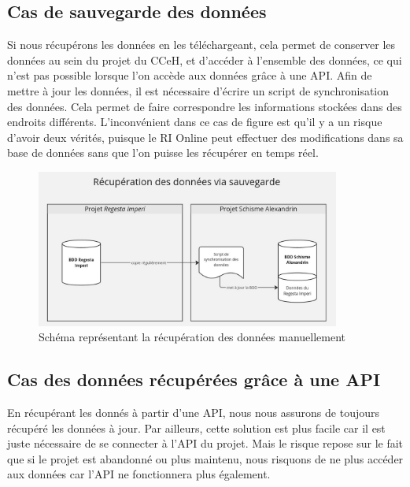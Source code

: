     \subsection{Cas de sauvegarde des données}

Si nous récupérons les données en les téléchargeant, cela permet de conserver les données au sein du projet du CCeH, et d'accéder à l'ensemble des données, ce qui n'est pas possible lorsque l'on accède aux données grâce à une API.
Afin de mettre à jour les données, il est nécessaire d'écrire un script de synchronisation des données. Cela permet de faire correspondre les informations stockées dans des endroits différents. L'inconvénient dans ce cas de figure est qu'il y a un risque d'avoir deux vérités, puisque le RI Online peut effectuer des modifications dans sa base de données sans que l'on puisse les récupérer en temps réel.\\ 

\begin{figure}[H]
    \centering
    \includegraphics[width=10cm]{images/recup-donnees-sauvegarde.jpg}
    \caption{Schéma représentant la récupération des données manuellement}
    \label{fig:schemadonneessauvegarde}
\end{figure}


    \subsection{Cas des données récupérées grâce à une API}

En récupérant les donnés à partir d'une API, nous nous assurons de toujours récupéré les données à jour. Par ailleurs, cette solution est plus facile car il est juste nécessaire de se connecter à l'API du projet. Mais le risque repose sur le fait que si le projet est abandonné ou plus maintenu, nous risquons de ne plus accéder aux données car l'API ne fonctionnera plus également.\\

